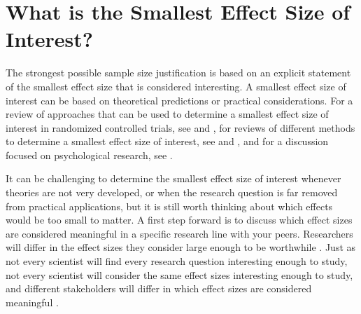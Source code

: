 \documentclass[
]{krantz}
\begin{document}
\hypertarget{what-is-the-smallest-effect-size-of-interest}{%
\section{What is the Smallest Effect Size of Interest?}\label{what-is-the-smallest-effect-size-of-interest}}

The strongest possible sample size justification is based on an explicit statement of the smallest effect size that is considered interesting. A smallest effect size of interest can be based on theoretical predictions or practical considerations. For a review of approaches that can be used to determine a smallest effect size of interest in randomized controlled trials, see \citet{cook_assessing_2014} and \citet{keefe_defining_2013}, for reviews of different methods to determine a smallest effect size of interest, see \citet{king_point_2011} and \citet{copay_understanding_2007}, and for a discussion focused on psychological research, see \citet{lakens_equivalence_2018}.

It can be challenging to determine the smallest effect size of interest whenever theories are not very developed, or when the research question is far removed from practical applications, but it is still worth thinking about which effects would be too small to matter. A first step forward is to discuss which effect sizes are considered meaningful in a specific research line with your peers. Researchers will differ in the effect sizes they consider large enough to be worthwhile \citep{murphy_statistical_2014}. Just as not every scientist will find every research question interesting enough to study, not every scientist will consider the same effect sizes interesting enough to study, and different stakeholders will differ in which effect sizes are considered meaningful \citep{kelley_effect_2012}.
\end{document}
